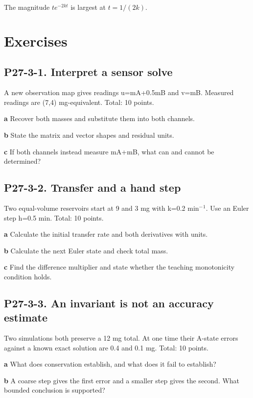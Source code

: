 \documentclass[11pt,letterpaper]{article}
\theoremstyle{definition}\newtheorem{definition}{Definition}\newtheorem{example}{Example}
\numberwithin{equation}{section}
\begin{document}
The magnitude $te^{-2kt}$ is largest at $t=1/(2k)$.
\bigskip
\section*{Exercises}
\par\noindent\begin{minipage}{\linewidth}
\subsection*{P27-3-1. Interpret a sensor solve}
A new observation map gives readings u=\allowbreak{}mA+\allowbreak{}0.5mB and v=\allowbreak{}mB. Measured readings are (7,4) mg-equivalent. Total: 10 points.

\textbf{a} Recover both masses and substitute them into both channels.

\end{minipage}\par\medskip
\textbf{b} State the matrix and vector shapes and residual units.

\textbf{c} If both channels instead measure mA+\allowbreak{}mB, what can and cannot be determined?

\par\noindent\begin{minipage}{\linewidth}
\subsection*{P27-3-2. Transfer and a hand step}
Two equal-volume reservoirs start at 9 and 3 mg with k=\allowbreak{}0.2 min$^-$$^1$. Use an Euler step h=\allowbreak{}0.5 min. Total: 10 points.

\textbf{a} Calculate the initial transfer rate and both derivatives with units.

\end{minipage}\par\medskip
\textbf{b} Calculate the next Euler state and check total mass.

\textbf{c} Find the difference multiplier and state whether the teaching monotonicity condition holds.

\par\noindent\begin{minipage}{\linewidth}
\subsection*{P27-3-3. An invariant is not an accuracy estimate}
Two simulations both preserve a 12 mg total. At one time their A-state errors against a known exact solution are 0.4 and 0.1 mg. Total: 10 points.

\textbf{a} What does conservation establish, and what does it fail to establish?

\end{minipage}\par\medskip
\textbf{b} A coarse step gives the first error and a smaller step gives the second. What bounded conclusion is supported?
\end{document}
